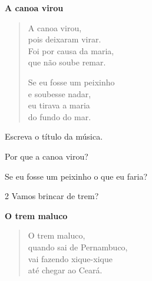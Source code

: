 
\textbf{A canoa virou}

\begin{verse}
A canoa virou,\\
pois deixaram virar.\\
Foi por causa da maria,\\
que não soube remar.

Se eu fosse um peixinho\\
e soubesse nadar,\\
eu tirava a maria\\
do fundo do mar.
\end{verse}


\begin{escolha}
\item Escreva o título da música.


\item Por que a canoa virou?


\item Se eu fosse um peixinho o que eu faria?

\end{escolha}

\num{2} Vamos brincar de trem?


\textbf{O trem maluco}

\begin{verse}
O trem maluco,\\
quando sai de Pernambuco,\\
vai fazendo xique-xique\\
até chegar ao Ceará.
\end{verse}


